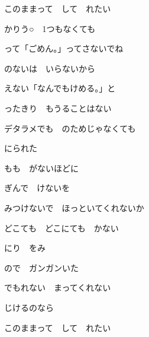 \documentclass[a4paper,tate,twocolumn,12pt]{ltjtarticle}
\begin{document}
\begin{flushleft}
\noindent\begin{minipage}{\linewidth}
このままって　して　れたい

かりう○　1つもなくても

って「ごめん。」ってさないでね

のないは　いらないから
\end{minipage}

\vspace{3em}

\noindent\begin{minipage}{\linewidth}
えない「なんでもけめる。」と

ったきり　もうることはない

デタラメでも　のためじゃなくても

にられた
\end{minipage}

\vspace{2em}

\noindent\begin{minipage}{\linewidth}
もも　がないほどに

ぎんで　けないを

みつけないで　ほっといてくれないか

どこても　どこにても　かない
\end{minipage}

\vspace{2em}

\noindent\begin{minipage}{\linewidth}
にり　をみ

ので　ガンガンいた

でもれない　まってくれない

じけるのなら
\end{minipage}

\vspace{2em}

\noindent\begin{minipage}{\linewidth}
このままって　して　れたい


\end{minipage}
\end{flushleft}
\end{document}
